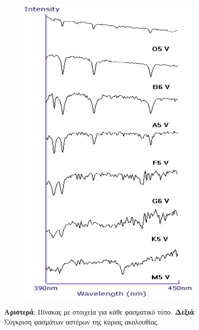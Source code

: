 \begin{figure}[h]
\begin{subfigure}[h]{0.5\textwidth}
	\includegraphics[scale=0.5]{Figures/spectra_comparison_harvard.png} 
    \end{subfigure}
    \caption{\textbf{Αριστερά}: Πίνακας με στοιχεία για κάθε φασματικό τύπο. \textbf{Δεξιά}: Σύγκριση φασμάτων αστέρων της κύριας ακολουθίας.}
    \label{fig:spectra_comparisson_table}
\end{figure}

